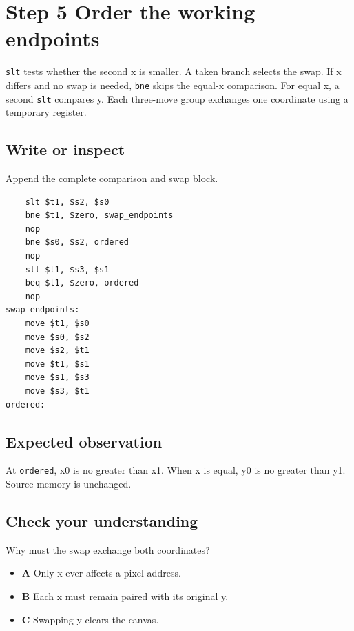 \section{Step 5 Order the working
  endpoints}\label{007-bresenham-line-s05-step-5-order-the-working-endpoints}

\texttt{slt} tests whether the second x is smaller. A taken branch
selects the swap. If x differs and no swap is needed, \texttt{bne} skips
the equal-x comparison. For equal x, a second \texttt{slt} compares y.
Each three-move group exchanges one coordinate using a temporary
register.

\subsection{Write or
  inspect}\label{007-bresenham-line-s05-write-or-inspect}

Append the complete comparison and swap block.

\begin{verbatim}
    slt $t1, $s2, $s0
    bne $t1, $zero, swap_endpoints
    nop
    bne $s0, $s2, ordered
    nop
    slt $t1, $s3, $s1
    beq $t1, $zero, ordered
    nop
swap_endpoints:
    move $t1, $s0
    move $s0, $s2
    move $s2, $t1
    move $t1, $s1
    move $s1, $s3
    move $s3, $t1
ordered:
\end{verbatim}

\subsection{Expected
  observation}\label{007-bresenham-line-s05-expected-observation}

At \texttt{ordered}, x0 is no greater than x1. When x is equal, y0 is no
greater than y1. Source memory is unchanged.

\subsection{Check your
  understanding}\label{007-bresenham-line-s05-check-your-understanding}

Why must the swap exchange both coordinates?

\begin{itemize}
  \tightlist
  \item
        \textbf{A} Only x ever affects a pixel address.
  \item
        \textbf{B} Each x must remain paired with its original y.
  \item
        \textbf{C} Swapping y clears the canvas.
\end{itemize}
